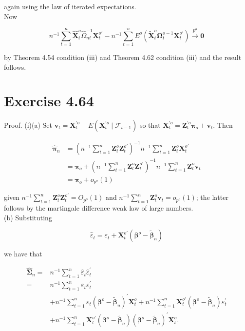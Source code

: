 \documentclass[10pt]{article}
\begin{document}
again using the law of iterated expectations.\\
Now

$$
n^{-1} \sum_{t=1}^{n} \hat{\mathbf{X}}_{t}^{o} \hat{\Omega}_{n t}^{-1} \mathbf{X}_{t}^{o \prime}-n^{-1} \sum_{t=1}^{n} E^{o}\left(\tilde{\mathbf{X}}_{t}^{o} \boldsymbol{\Omega}_{t}^{o-1} \mathbf{X}_{t}^{o \prime}\right) \xrightarrow{p^{o}} \mathbf{0}
$$

by Theorem 4.54 condition (iii) and Theorem 4.62 condition (iii) and the result follows.

\section*{Exercise 4.64}
Proof. (i)(a) Set $\boldsymbol{v}_{t}=\mathbf{X}_{t}^{\prime o}-E\left(\mathbf{X}_{t}^{\prime o} \mid \mathcal{F}_{t-1}\right)$ so that $\mathbf{X}_{t}^{\prime o}=\mathbf{Z}_{t}^{\prime o} \boldsymbol{\pi}_{o}+\boldsymbol{v}_{t}$. Then

$$
\begin{aligned}
\hat{\boldsymbol{\pi}}_{n} & =\left(n^{-1} \sum_{t=1}^{n} \mathbf{Z}_{t}^{o} \mathbf{Z}_{t}^{o \prime}\right)^{-1} n^{-1} \sum_{t=1}^{n} \mathbf{Z}_{t}^{o} \mathbf{X}_{t}^{o \prime} \\
& =\boldsymbol{\pi}_{o}+\left(n^{-1} \sum_{t=1}^{n} \mathbf{Z}_{t}^{o} \mathbf{Z}_{t}^{o \prime}\right)^{-1} n^{-1} \sum_{t=1}^{n} \mathbf{Z}_{t}^{o} \boldsymbol{v}_{t} \\
& =\boldsymbol{\pi}_{o}+o_{p^{o}}(1)
\end{aligned}
$$

given $n^{-1} \sum_{t=1}^{n} \mathbf{Z}_{t}^{o} \mathbf{Z}_{t}^{o \prime}=O_{p^{o}}(1)$ and $n^{-1} \sum_{t=1}^{n} \mathbf{Z}_{t}^{o} \boldsymbol{v}_{t}=o_{p^{o}}(1)$; the latter follows by the martingale difference weak law of large numbers.\\
(b) Substituting

$$
\hat{\varepsilon}_{t}=\varepsilon_{t}+\mathbf{X}_{t}^{o \prime}\left(\boldsymbol{\beta}^{o}-\tilde{\boldsymbol{\beta}}_{n}\right)
$$

we have that

$$
\begin{aligned}
\hat{\boldsymbol{\Sigma}}_{n}= & n^{-1} \sum_{t=1}^{n} \hat{\varepsilon}_{t} \hat{\varepsilon}_{t}^{\prime} \\
= & n^{-1} \sum_{t=1}^{n} \varepsilon_{t} \varepsilon_{t}^{\prime} \\
& +n^{-1} \sum_{t=1}^{n} \varepsilon_{t}\left(\boldsymbol{\beta}^{o}-\tilde{\boldsymbol{\beta}}_{n}\right)^{\prime} \mathbf{X}_{t}^{o}+n^{-1} \sum_{t=1}^{n} \mathbf{X}_{t}^{o \prime}\left(\boldsymbol{\beta}^{o}-\tilde{\boldsymbol{\beta}}_{n}\right) \varepsilon_{t}^{\prime} \\
& +n^{-1} \sum_{t=1}^{n} \mathbf{X}_{t}^{o \prime}\left(\boldsymbol{\beta}^{o}-\tilde{\boldsymbol{\beta}}_{n}\right)\left(\boldsymbol{\beta}^{o}-\tilde{\boldsymbol{\beta}}_{n}\right)^{\prime} \mathbf{X}_{t}^{o} .
\end{aligned}
$$
\end{document}
